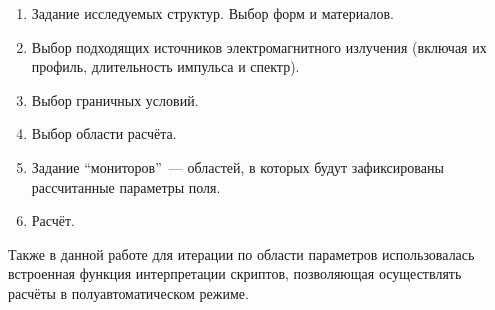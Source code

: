 \begin{enumerate}[label=\arabic*)]
	\item Задание исследуемых структур. Выбор форм и материалов.
	\item Выбор подходящих источников электромагнитного излучения (включая их профиль, длительность импульса и спектр).
	\item Выбор граничных условий.
	\item Выбор области расчёта.
	\item Задание ``мониторов''~--- областей, в которых будут зафиксированы рассчитанные параметры поля.
	\item Расчёт.
\end{enumerate}

Также в данной работе для итерации по области параметров использовалась встроенная функция интерпретации скриптов, позволяющая осуществлять расчёты в полуавтоматическом режиме.